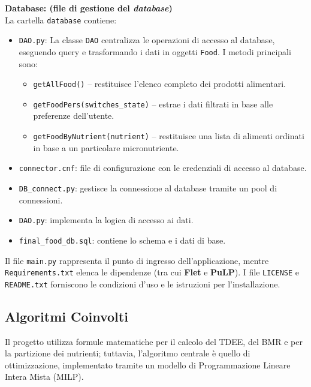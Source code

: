 \documentclass[11pt,a4paper]{article}
\begin{document}
\textbf{Database: (file di gestione del \textit{database})} \\
La cartella \texttt{database} contiene:
\begin{itemize}
    \item \texttt{DAO.py}: La classe \texttt{DAO} centralizza le operazioni di accesso al database, eseguendo query e trasformando i dati in oggetti \texttt{Food}. I metodi principali sono: 
        \begin{itemize}
        \item \texttt{getAllFood()} – restituisce l’elenco completo dei prodotti alimentari.
        \item \texttt{getFoodPers(switches\_state)} – estrae i dati filtrati in base alle preferenze dell’utente.
        \item \texttt{getFoodByNutrient(nutrient)} – restituisce una lista di alimenti ordinati in base a un particolare micronutriente.
        \end{itemize}
    \item \texttt{connector.cnf}: file di configurazione con le credenziali di accesso al database.
    \item \texttt{DB\_connect.py}: gestisce la connessione al database tramite un pool di connessioni.
    \item \texttt{DAO.py}: implementa la logica di accesso ai dati.
    \item \texttt{final\_food\_db.sql}: contiene lo schema e i dati di base.
\end{itemize}
Il file \texttt{main.py} rappresenta il punto di ingresso dell'applicazione, mentre \texttt{Requirements.txt} elenca le dipendenze (tra cui \textbf{Flet} e \textbf{PuLP}). I file \texttt{LICENSE} e \texttt{README.txt} forniscono le condizioni d'uso e le istruzioni per l'installazione.

\subsection{Algoritmi Coinvolti}

Il progetto utilizza formule matematiche per il calcolo del TDEE, del BMR e per la partizione dei nutrienti; tuttavia, l'algoritmo centrale è quello di ottimizzazione, implementato tramite un modello di Programmazione Lineare Intera Mista (MILP).
\end{document}
